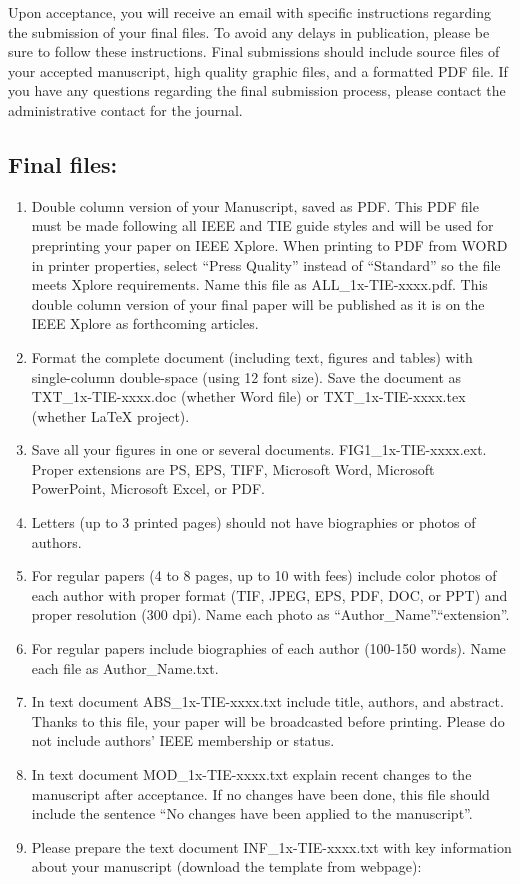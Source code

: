 \documentclass[journal]{IEEEtranTIE}
\begin{document}
Upon acceptance, you will receive an email with specific instructions regarding the submission of your final files.  To avoid any delays in publication, please be sure to follow these instructions. Final submissions should include source files of your accepted manuscript, high quality graphic files, and a formatted PDF file. If you have any questions regarding the final submission process, please contact the administrative contact for the journal.

\subsection{Final files:}

\begin{enumerate}[1)]
	\item Double column version of your Manuscript, saved as PDF. This PDF file must be made following all IEEE and TIE guide styles and will be used for preprinting your paper on IEEE Xplore. When printing to PDF from WORD in printer properties, select  ``Press Quality'' instead of ``Standard'' so the file meets Xplore requirements. Name this file as ALL\_1x-TIE-xxxx.pdf. This double column version of your final paper will be published as it is on the IEEE Xplore as forthcoming articles.
	\item Format the complete document (including text, figures and tables) with single-column double-space (using 12 font size). Save the document as TXT\_1x-TIE-xxxx.doc (whether Word file) or TXT\_1x-TIE-xxxx.tex (whether LaTeX project).
	\item Save all your figures in one or several documents. FIG1\_1x-TIE-xxxx.ext. Proper extensions are PS, EPS, TIFF, Microsoft Word, Microsoft PowerPoint, Microsoft Excel, or PDF.
	\item Letters (up to 3 printed pages) should not have biographies or photos of authors.
	\item For regular papers (4 to 8 pages, up to 10 with fees) include color photos of each author with proper format (TIF, JPEG, EPS, PDF, DOC, or PPT) and proper resolution (300 dpi). Name each photo as ``Author\_Name''.``extension''.
	\item For regular papers include biographies of each author (100-150 words). Name each file as Author\_Name.txt.
	\item In text document ABS\_1x-TIE-xxxx.txt include title, authors, and abstract. Thanks to this file, your paper will be broadcasted before printing. Please do not include authors' IEEE membership or status.
	\item In text document MOD\_1x-TIE-xxxx.txt explain recent changes to the manuscript after acceptance. If no changes have been done, this file should include the sentence ``No changes have been applied to the manuscript''.
	\item Please prepare the text document INF\_1x-TIE-xxxx.txt with key information about your manuscript (download the template from webpage):


\end{enumerate}
\end{document}
